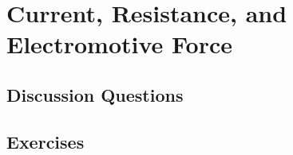 
\chapter{Current, Resistance, and Electromotive Force}

\section{Discussion Questions}

\section{Exercises}
